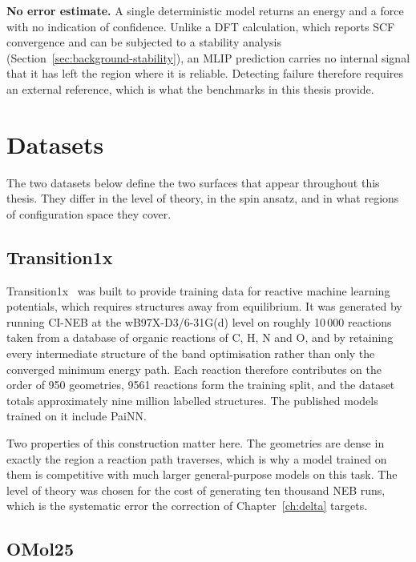 \textbf{No error estimate.} A single deterministic model returns an energy and a force
with no indication of confidence. Unlike a DFT calculation, which reports SCF
convergence and can be subjected to a stability analysis
(Section~\ref{sec:background-stability}), an MLIP prediction carries no internal signal
that it has left the region where it is reliable. Detecting failure therefore requires
an external reference, which is what the benchmarks in this thesis provide.
 
\section{Datasets}
\label{sec:background-datasets}
 
The two datasets below define the two surfaces that appear throughout this thesis. They
differ in the level of theory, in the spin ansatz, and in what regions of configuration
space they cover.
 
\subsection{Transition1x}
\label{sec:dataset-t1x}
 
Transition1x~\cite{schreiner2022} was built to provide training data for reactive
machine learning potentials, which requires structures away from equilibrium. It was
generated by running CI-NEB at the \mbox{wB97X-D3/6-31G(d)} level on roughly 10\,000
reactions taken from a database of organic reactions of C, H, N and O, and by retaining
every intermediate structure of the band optimisation rather than only the converged
minimum energy path. Each reaction therefore contributes on the order of 950 geometries,
9561 reactions form the training split, and the dataset totals approximately nine million
labelled structures. The published models trained on it include PaiNN.
 
Two properties of this construction matter here. The geometries are dense in exactly the
region a reaction path traverses, which is why a model trained on them is competitive
with much larger general-purpose models on this task. The level of theory was chosen for
the cost of generating ten thousand NEB runs, which is the systematic error the
correction of Chapter~\ref{ch:delta} targets.
 
\subsection{OMol25}
\label{sec:dataset-omol}
 
